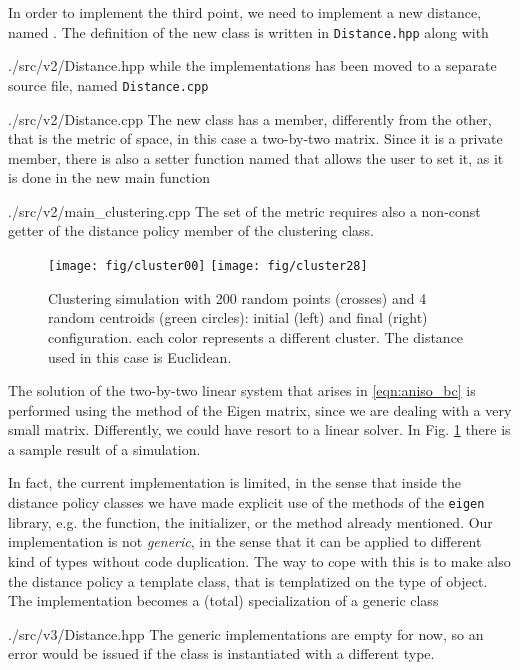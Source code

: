 In order to implement the third point, we need to implement a new distance,
named . The definition of the new class is written in
\texttt{Distance.hpp} along with 
%
\lstset{basicstyle=\scriptsize\sf}
    
    {./src/v2/Distance.hpp}
\lstset{basicstyle=\sf}
%
while the implementations has been moved to a separate source file, named
\texttt{Distance.cpp}
%
\lstset{basicstyle=\scriptsize\sf}
    
    {./src/v2/Distance.cpp}
\lstset{basicstyle=\sf}
%
The new class has a member, differently from the other, that is the metric of
space, in this case a two-by-two matrix. Since it is a private member, there is
also a setter function named  that allows the user to set it,
as it is done in the new main function
%
\lstset{basicstyle=\scriptsize\sf}
    
    {./src/v2/main_clustering.cpp}
\lstset{basicstyle=\sf}
%
The set of the metric requires also a non-const getter of the distance policy
member of the clustering class.

%
\begin{figure}
\texttt{[image: fig/cluster00]}
\hfil
\texttt{[image: fig/cluster28]}
\caption{Clustering simulation with 200 random points (crosses) and 4 random
         centroids (green circles): initial (left) and final (right)
         configuration. each color represents a different cluster. The distance
         used in this case is Euclidean.}
\label{fig:cluster_sim}
\end{figure}
%
The solution of the two-by-two linear system that arises in \eqref{eqn:aniso_bc}
is performed using the  method of the Eigen matrix, since we are
dealing with a very small matrix. Differently, we could have resort to a linear
solver. In Fig. \ref{fig:cluster_sim} there is a sample result of a simulation.

In fact, the current implementation is limited, in the sense that inside the
distance policy classes we have made explicit use of the methods of the
\texttt{eigen} library, e.g. the  function, the 
initializer, or the  method already mentioned. Our implementation
is not \emph{generic}, in the sense that it can be applied to different kind of
types without code duplication. The way to cope with this is to make also the
distance policy a template class, that is templatized on the type of object.
The  implementation becomes a (total) specialization of a generic
class
%
\lstset{basicstyle=\scriptsize\sf}
    
    {./src/v3/Distance.hpp}
\lstset{basicstyle=\sf}
%
The generic implementations are empty for now, so an error would be issued if
the  class is instantiated with a different type.

